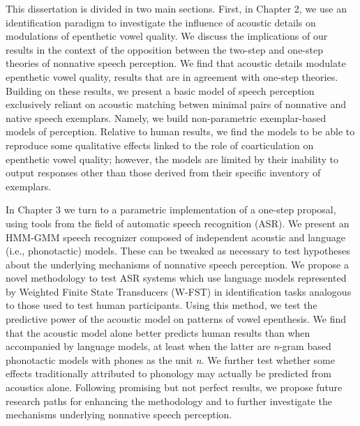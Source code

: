 This dissertation is divided in two main sections. First, in Chapter 2, we use an identification paradigm to investigate the influence of acoustic details on modulations of epenthetic vowel quality. We discuss the implications of our results in the context of the opposition between the two-step and one-step theories of nonnative speech perception. We find that acoustic details modulate epenthetic vowel quality, results that are in agreement with one-step theories. Building on these results, we present a basic model of speech perception exclusively reliant on acoustic matching betwen minimal pairs of nonnative and native speech exemplars. Namely, we build non-parametric exemplar-based models of perception. Relative to human results, we find the models to be able to reproduce some qualitative effects linked to the role of coarticulation on epenthetic vowel quality; however, the models are limited by their inability to output responses other than those derived from their specific inventory of exemplars.

In Chapter 3 we turn to a parametric implementation of a one-step proposal, using tools from the field of automatic speech recognition (ASR). We present an HMM-GMM speech recognizer composed of independent acoustic and language (i.e., phonotactic) models. These can be tweaked as necessary to test hypotheses about the underlying mechanisms of nonnative speech perception. We propose a novel methodology to test ASR systems which use language models represented by Weighted Finite State Transducers (W-FST) in identification tasks analogous to those used to test human participants. Using this method, we test the predictive power of the acoustic model on patterns of vowel epenthesis. We find that the acoustic model alone better predicts human results than when accompanied by language models, at least when the latter are \textit{n}-gram based phonotactic models with phones as the unit \textit{n}. We further test whether some effects traditionally attributed to phonology may actually be predicted from acoustics alone. Following promising but not perfect results, we propose future research paths for enhancing the methodology and to further investigate the mechanisms underlying nonnative speech perception.  